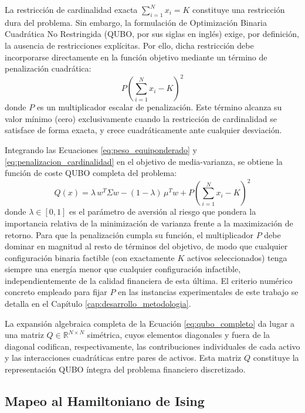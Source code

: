 La restricción de cardinalidad exacta $\sum_{i=1}^N x_i = K$ constituye una restricción dura del problema. Sin embargo, la formulación de Optimización Binaria Cuadrática No Restringida (QUBO, por sus siglas en inglés) exige, por definición, la ausencia de restricciones explícitas. Por ello, dicha restricción debe incorporarse directamente en la función objetivo mediante un término de penalización cuadrática:
\begin{equation}
    P \left( \sum_{i=1}^N x_i - K \right)^2
    \label{eq:penalizacion_cardinalidad}
\end{equation}
donde $P$ es un multiplicador escalar de penalización. Este término alcanza su valor mínimo (cero) exclusivamente cuando la restricción de cardinalidad se satisface de forma exacta, y crece cuadráticamente ante cualquier desviación.

Integrando las Ecuaciones \eqref{eq:peso_equiponderado} y \eqref{eq:penalizacion_cardinalidad} en el objetivo de media-varianza, se obtiene la función de coste QUBO completa del problema:
\begin{equation}
    Q(x) = \lambda \, w^T \Sigma w - (1-\lambda)\, \mu^T w
    + P \left( \sum_{i=1}^N x_i - K \right)^2
    \label{eq:qubo_completo}
\end{equation}
donde $\lambda \in [0,1]$ es el parámetro de aversión al riesgo que pondera la importancia relativa de la minimización de varianza frente a la maximización de retorno. Para que la penalización cumpla su función, el multiplicador $P$ debe dominar en magnitud al resto de términos del objetivo, de modo que cualquier configuración binaria factible (con exactamente $K$ activos seleccionados) tenga siempre una energía menor que cualquier configuración infactible, independientemente de la calidad financiera de esta última. El criterio numérico concreto empleado para fijar $P$ en las instancias experimentales de este trabajo se detalla en el Capítulo \ref{cap:desarrollo_metodologia}.

La expansión algebraica completa de la Ecuación \eqref{eq:qubo_completo} da lugar a una matriz $Q \in \mathbb{R}^{N \times N}$ simétrica, cuyos elementos diagonales y fuera de la diagonal codifican, respectivamente, las contribuciones individuales de cada activo y las interacciones cuadráticas entre pares de activos. Esta matriz $Q$ constituye la representación QUBO íntegra del problema financiero discretizado.

\subsection{Mapeo al Hamiltoniano de Ising}
\label{subsec:mapeo_ising}

